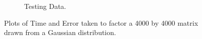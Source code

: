 \begin{figure}
\begin{subfigure}[b]{.45\textwidth}
\begin{center}
		\caption{Testing Data.}
\end{center}
	\end{subfigure}
\hfill
	\caption{Plots of Time and Error taken to factor a 4000 by 4000 matrix drawn from a Gaussian distribution.}	
\end{figure}
